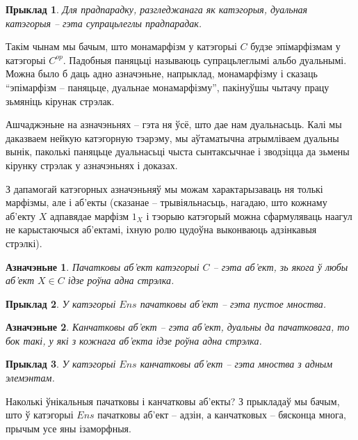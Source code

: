 \documentclass[a4paper,12pt]{book}
\newtheorem{example}{Прыклад}[section]
\newtheorem{definition}{Азначэньне}[section]
\begin{document}
\begin{example}
  Для прадпарадку, разгледжанага як катэгорыя, дуальная катэгорыя --
  гэта супрацьлеглы прадпарадак.
\end{example}

Такім чынам мы бачым, што монамарфізм у катэгорыі $C$ будзе
эпімарфізмам у катэгорыі $C^{op}$. Падобныя паняцьці называюць
супрацьлеглымі альбо дуальнымі. Можна было б даць адно азначэньне,
напрыклад, монамарфізму і сказаць ``эпімарфізм -- паняцьце, дуальнае
монамарфізму'', пакінуўшы чытачу працу зьмяніць кірунак стрэлак.

Ашчаджэньне на азначэньнях -- гэта ня ўсё, што дае нам
дуальнасьць. Калі мы даказваем нейкую катэгорную тэарэму, мы
аўтаматычна атрымліваем дуальны вынік, паколькі паняцьце дуальнасьці
чыста сынтаксычнае і зводзіцца да зьмены кірунку стрэлак у азначэньнях
і доказах.

З дапамогай катэгорных азначэньняў мы можам характарызаваць ня толькі
марфізмы, але і аб'екты (сказанае -- трывіяльнасьць, нагадаю, што
кожнаму аб'екту $X$ адпавядае марфізм $1_X$ і тэорыю катэгорый можна
сфармуляваць наагул не карыстаючыся аб'ектамі, іхную ролю цудоўна
выконваюць адзінкавыя стрэлкі).

\begin{definition}
  Пачатковы аб'ект катэгорыі $C$ -- гэта аб'ект, зь якога ў любы
  аб'ект $X \in C$ ідзе роўна адна стрэлка.
\end{definition}

\begin{example}
  У катэгорыі $Ens$ пачатковы аб'ект -- гэта пустое мноства.
\end{example}

\begin{definition}
  Канчатковы аб'ект -- гэта аб'ект, дуальны да пачатковага, то бок
  такі, у які з кожнага аб'екта ідзе роўна адна стрэлка.
\end{definition}

\begin{example}
  У катэгорыі $Ens$ канчатковы аб'ект -- гэта мноства з адным элемэнтам.
\end{example}

Наколькі ўнікальныя пачатковы і канчатковы аб'екты? З прыкладаў мы
бачым, што ў катэгорыі $Ens$ пачатковы аб'ект -- адзін, а канчатковых
-- бясконца многа, прычым усе яны ізаморфныя.
\end{document}

